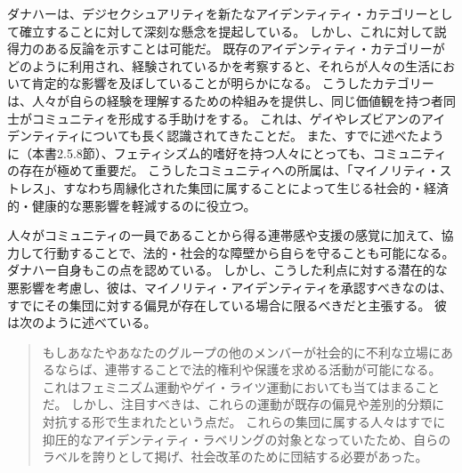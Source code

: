 \documentclass[paper=a4,book,openany]{jlreq}
\begin{document}
ダナハーは、デジセクシュアリティを新たなアイデンティティ・カテゴリーとして確立することに対して深刻な懸念を提起している。
しかし、これに対して説得力のある反論を示すことは可能だ。
既存のアイデンティティ・カテゴリーがどのように利用され、経験されているかを考察すると、それらが人々の生活において肯定的な影響を及ぼしていることが明らかになる。
こうしたカテゴリーは、人々が自らの経験を理解するための枠組みを提供し、同じ価値観を持つ者同士がコミュニティを形成する手助けをする。
これは、ゲイやレズビアンのアイデンティティについても長く認識されてきたことだ。
また、すでに述べたように（本書2.5.8節）、フェティシズム的嗜好を持つ人々にとっても、コミュニティの存在が極めて重要だ。
こうしたコミュニティへの所属は、「マイノリティ・ストレス」、すなわち周縁化された集団に属することによって生じる社会的・経済的・健康的な悪影響を軽減するのに役立つ\citep{salfas19:_what_is_role_commun}。

人々がコミュニティの一員であることから得る連帯感や支援の感覚に加えて、協力して行動することで、法的・社会的な障壁から自らを守ることも可能になる。
ダナハー自身もこの点を認めている。
しかし、こうした利点に対する潜在的な悪影響を考慮し、彼は、マイノリティ・アイデンティティを承認すべきなのは、すでにその集団に対する偏見が存在している場合に限るべきだと主張する。
彼は次のように述べている。

\begin{quote}
もしあなたやあなたのグループの他のメンバーが社会的に不利な立場にあるならば、連帯することで法的権利や保護を求める活動が可能になる。
これはフェミニズム運動やゲイ・ライツ運動においても当てはまることだ。
しかし、注目すべきは、これらの運動が既存の偏見や差別的分類に対抗する形で生まれたという点だ。
これらの集団に属する人々はすでに抑圧的なアイデンティティ・ラベリングの対象となっていたため、自らのラベルを誇りとして掲げ、社会改革のために団結する必要があった。
\citep[p.395]{danaher20:_sexual}

\end{quote}
\end{document}
